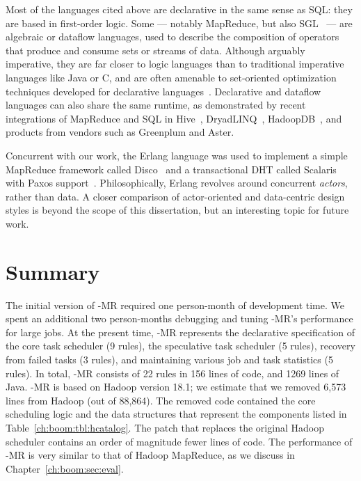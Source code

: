 Most of the languages cited above are declarative in the same sense as SQL: they are 
based in first-order logic. Some --- notably MapReduce, but also SGL~\cite{cornellgames} --- are
algebraic or dataflow languages, used to describe the composition of operators that produce and 
consume sets or streams of data.  Although arguably imperative, they are far closer to logic languages 
than to traditional imperative languages like Java or C, and are often amenable to set-oriented optimization 
techniques developed for declarative languages~\cite{cornellgames}. Declarative and dataflow languages 
can also share the same runtime, as demonstrated by recent integrations of MapReduce and SQL
in Hive~\cite{hive-vldb}, DryadLINQ~\cite{DryadLINQ}, HadoopDB~\cite{hadoopdb}, and products from vendors 
such as Greenplum and Aster.

Concurrent with our work, the Erlang language was used to implement a simple MapReduce framework called 
Disco~\cite{disco} and a transactional DHT called Scalaris with Paxos support~\cite{scalaris}. Philosophically, Erlang 
revolves around concurrent {\em actors}, rather than data. A closer comparison of actor-oriented and data-centric design 
styles is beyond the scope of this dissertation, but an interesting topic for future work.

\section{Summary}
\label{ch:boom:sec:conclusion}

The initial version of \BOOM-MR required one person-month of development time.
We spent an additional two person-months debugging and tuning \BOOM-MR's
performance for large jobs.  At the present time, \BOOM-MR represents the
declarative specification of the core task scheduler (9 rules), the speculative
task scheduler (5 rules), recovery from failed tasks (3 rules), and maintaining
various job and task statistics (5 rules).  In total, \BOOM-MR consists of 22
\OVERLOG rules in 156 lines of code, and 1269 lines of Java.  \BOOM-MR is based
on Hadoop version 18.1; we estimate that we removed 6,573 lines from Hadoop
(out of 88,864).  The removed code contained the core scheduling logic and the
data structures that represent the components listed in
Table~\ref{ch:boom:tbl:hcatalog}.  The \OVERLOG patch that replaces the
original Hadoop scheduler contains an order of magnitude fewer lines of code.
The performance of \BOOM-MR is very similar to that of Hadoop MapReduce, as we
discuss in Chapter~\ref{ch:boom:sec:eval}.

